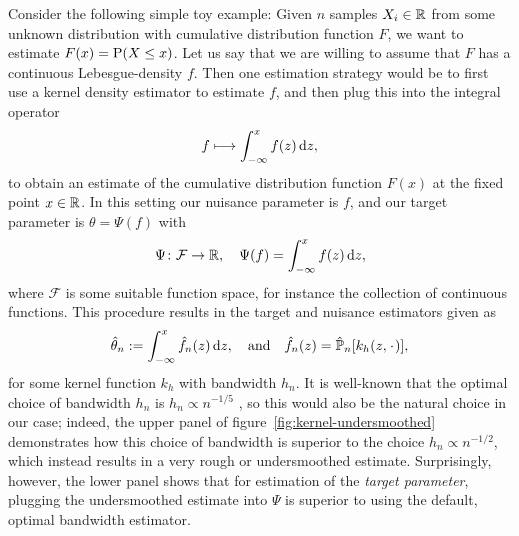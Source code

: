 \documentclass[a4,danish]{article}
\begin{document}
\begin{example}
  \label{example:kernel-cdf}
  Consider the following simple toy example: Given $n$ samples $X_i \in \R$ from some unknown
  distribution with cumulative distribution function $F$, we want to estimate $F(x) = \P(X \leq x)$.
  Let us say that we are willing to assume that $F$ has a continuous Lebesgue-density $f$. Then one
  estimation strategy would be to first use a kernel density estimator to estimate $f$, and then
  plug this into the integral operator
  \begin{equation*}
    f \longmapsto \int_{-\infty}^x f(z) \diff z,
  \end{equation*}
  to obtain an estimate of the cumulative distribution function $F(x)$ at the fixed point
  $x \in \R$. In this setting our nuisance parameter is $f$, and our target parameter is
  $\theta = \Psi(f)$ with
  \begin{equation*}
    \Psi \colon \mathcal{F} \rightarrow \R, \quad \Psi(f) = \int_{-\infty}^x f(z) \diff z,
  \end{equation*}
  where $\mathcal{F}$ is some suitable function space, for instance the collection of continuous
  functions. This procedure results in the target and nuisance estimators given as
  \begin{equation}
    \hat{\theta}_n := \int_{-\infty}^x \hat{f}_n(z)  \diff z,
    \quad \text{and} \quad
    \hat{f}_n(z) = \empmeas[k_h(z, \blank)],
  \end{equation}
  for some kernel function $k_h$ with bandwidth $h_n$. It is well-known that the optimal choice of
  bandwidth $h_n$ is $h_n \propto n^{-1/5}$ \citep{wasserman2006all}, so this would also be the
  natural choice in our case; indeed, the upper panel of figure~\ref{fig:kernel-undersmoothed}
  demonstrates how this choice of bandwidth is superior to the choice $h_n \propto n^{-1/2}$, which
  instead results in a very rough or undersmoothed estimate. Surprisingly, however, the lower panel
  shows that for estimation of the \textit{target parameter}, plugging the undersmoothed estimate
  into $\Psi$ is superior to using the default, optimal bandwidth estimator. 


\end{example}
\end{document}
